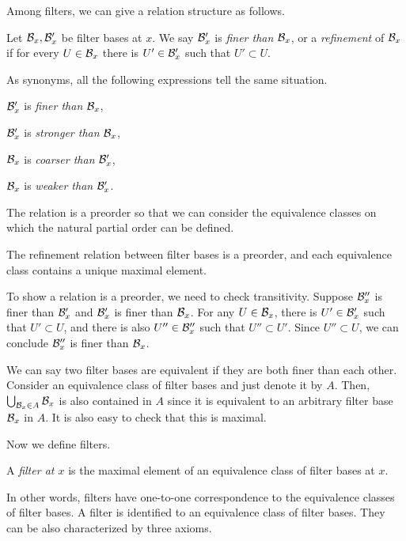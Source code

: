 Among filters, we can give a relation structure as follows.

\begin{defn}
Let $\mathcal{B}_x,\mathcal{B}'_x$ be filter bases at $x$.
We say $\mathcal{B}'_x$ is \emph{finer than} $\mathcal{B}_x$, or a \emph{refinement} of $\mathcal{B}_x$ if for every $U\in\mathcal{B}_x$ there is $U'\in\mathcal{B}'_x$ such that $U'\subset U$.
\end{defn}

As synonyms, all the following expressions tell the same situation.
\begin{cond}
\item $\mathcal{B}'_x$ is \emph{finer than} $\mathcal{B}_x$,
\item $\mathcal{B}'_x$ is \emph{stronger than} $\mathcal{B}_x$,
\item $\mathcal{B}_x$ is \emph{coarser than} $\mathcal{B}'_x$,
\item $\mathcal{B}_x$ is \emph{weaker than} $\mathcal{B}'_x$.
\end{cond}
The relation is a preorder so that we can consider the equivalence classes on which the natural partial order can be defined.

\begin{prop}
The refinement relation between filter bases is a preorder, and each equivalence class contains a unique maximal element.
\end{prop}
\begin{pf}
To show a relation is a preorder, we need to check transitivity.
Suppose $\mathcal{B}''_x$ is finer than $\mathcal{B}'_x$ and $\mathcal{B}'_x$ is finer than $\mathcal{B}_x$.
For any $U\in\mathcal{B}_x$, there is $U'\in\mathcal{B}'_x$ such that $U'\subset U$, and there is also $U''\in\mathcal{B}''_x$ such that $U''\subset U'$.
Since $U''\subset U$, we can conclude $\mathcal{B}''_x$ is finer than $\mathcal{B}_x$.

We can say two filter bases are equivalent if they are both finer than each other.
Consider an equivalence class of filter bases and just denote it by $A$.
Then, $\bigcup_{\mathcal{B}_x\in A}\mathcal{B}_x$ is also contained in $A$ since it is equivalent to an arbitrary filter base $\mathcal{B}_x$ in $A$.
It is also easy to check that this is maximal.
\end{pf}

Now we define filters.

\begin{defn}
A \emph{filter at $x$} is the maximal element of an equivalence class of filter bases at $x$.
\end{defn}

In other words, filters have one-to-one correspondence to the equivalence classes of filter bases.
A filter is identified to an equivalence class of filter bases.
They can be also characterized by three axioms.

